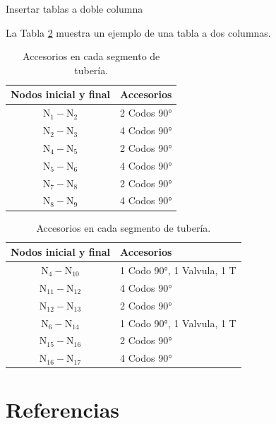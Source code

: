 \documentclass[aspectratio=169]{beamer} %
\begin{document}
\begin{frame}{Insertar tablas a doble columna}

    La Tabla \ref{Tab:Accesorios} muestra un ejemplo de una tabla a dos columnas.
    
    \begin{table}[htbp]
        \centering
        \caption{Accesorios en cada segmento de tubería.}
        \label{Tab:Accesorios}
        \null\hfill
        \footnotesize
        \begin{tabular}{cl}
            \toprule
            \textbf{Nodos inicial y final} & \textbf{Accesorios} \\
            \midrule
            $\text{N}_{1}-\text{N}_{2}$ & 2 Codos 90°\\
            $\text{N}_{2}-\text{N}_{3}$ & 4 Codos 90° \\ 
            $\text{N}_{4}-\text{N}_{5}$ & 2 Codos 90° \\ 
            $\text{N}_{5}-\text{N}_{6}$ & 4 Codos 90° \\ 
            $\text{N}_{7}-\text{N}_{8}$ & 2 Codos 90° \\
            $\text{N}_{8}-\text{N}_{9}$ & 4 Codos 90° \\ 
            \bottomrule
            \end{tabular}
            \hfill\hfill
            \begin{tabular}{cl}
            \toprule
            \textbf{Nodos inicial y final} & \textbf{Accesorios} \\
            \midrule
            $\text{N}_{4}-\text{N}_{10}$ & 1 Codo 90°, 1 Valvula, 1 T \\ 
            $\text{N}_{11}-\text{N}_{12}$ & 4 Codos 90° \\ 
            $\text{N}_{12}-\text{N}_{13}$ & 2 Codos 90° \\ 
            $\text{N}_{6}-\text{N}_{14}$ & 1 Codo 90°, 1 Valvula, 1 T \\        
            $\text{N}_{15}-\text{N}_{16}$ & 2 Codos 90° \\ 
            $\text{N}_{16}-\text{N}_{17}$ & 4 Codos 90° \\ 
            \bottomrule
        \end{tabular}
        \hfill\null
    \end{table}
    
\end{frame}


\section{Referencias}
\end{document}
